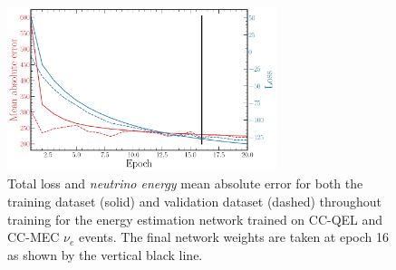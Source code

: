 \begin{figure} %
    \includegraphics[width=0.7\textwidth]{diagrams/7-results/final_energy_history.pdf}
    \caption[Loss and mean absolute error throughout training for the energy estimation network]
    {Total loss and \emph{neutrino energy} mean absolute error for both the training dataset
        (solid) and validation dataset (dashed) throughout training for the energy estimation
        network trained on CC-QEL and CC-MEC $\nu_{e}$ events. The final network weights are taken
        at epoch 16 as shown by the vertical black line.}
    \label{fig:final_energy_history}
\end{figure}